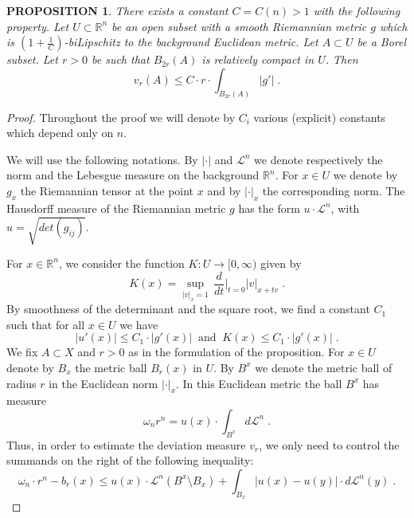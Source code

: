 \documentclass[12pt,leqno]{amsart}
\numberwithin{equation}{section}
\newtheorem{prop}[thm]{PROPOSITION}
\theoremstyle{definition}
\theoremstyle{remark}
\newcommand{\R}{\mathbb{R}}
\def\eps{\varepsilon}
\begin{document}
\begin{prop}\label{prop-smooth}
There exists a constant $C=C(n)>1$ with the following property.
Let $U\subset \R^n$ be an open subset with a smooth Riemannian
metric $g$ which is $(1+\frac 1 C)$-biLipschitz to  the background Euclidean metric.
  Let $A\subset U$ be a Borel subset. Let $r>0$ be such that $B_{2r} (A)$ is relatively compact in $U$.
Then  $$v_r (A) \leq C \cdot r \cdot \int _{B_{2r} ( A)} |g' | \;.$$
\end{prop}



 \begin{proof}
Throughout the proof we will denote by $C_i$ various (explicit) constants which depend only on $n$.

We will use the following notations. By $|\cdot|$ and $\mathcal L^n$ we denote respectively the norm and the Lebesgue measure on the background $\R^n$.
 For $x\in U$ we denote by $g_x$ the Riemannian tensor at the point $x$ and
 by $|\cdot |_x$ the corresponding norm. %
The Hausdorff measure of the Riemannian metric
 $g$ has the form $u\cdot \mathcal L^n$, with $u=\sqrt {det (g_{ij})}$.




For $x\in \R^n$, we consider the function $K :U\to [0,\infty)$ given by
$$K (x)=\sup _{|v|_x =1}\,  \frac d {dt}\Big |_{t=0} |v| _{x+tv} \; .$$
  By smoothness of the determinant and the square root,
we find a constant $C_1$ such that  for all $x\in U$  we have
\begin{equation} \label{eq:Kg}
|u' (x)|  \leq C_1\cdot  |g' (x)|  \; \;  \text{and}  \; \;  K (x)  \leq C_1 \cdot  |g' (x)|  \;.
\end{equation}
 We fix $A\subset X$ and $r>0$ as in the formulation of the proposition. For $x\in U$ denote by $B_x$
 the metric ball $B_r(x)$ in $U$.  By $B^x$ we denote the metric ball of radius $r$ in the Euclidean  norm $|\cdot |_x$.  In this Euclidean metric the ball $B^x$ has measure
 $$\omega _n r^n =u(x)\cdot \int _{B^x} d\mathcal L^n \;.$$
Thus, in order to estimate the deviation measure $v_r$, we only need to control the summands on the right of the following  inequality:
\begin{equation} \label{eq:summand}
\omega _n \cdot r^n - b_r (x) \leq  u(x) \cdot \mathcal L^n(  B^x\setminus B_x)   + \int _{B_x}  |u(x)-  u(y)| \cdot
d\mathcal  L^n (y)   \; .
\end{equation}




\end{proof}
\end{document}

